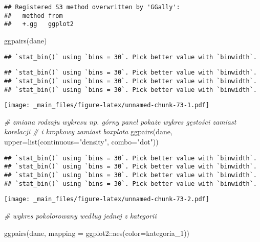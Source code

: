\documentclass[
]{book}
\newenvironment{Shaded}{\begin{snugshade}}{\end{snugshade}}
\newcommand{\AttributeTok}[1]{\textcolor[rgb]{0.77,0.63,0.00}{#1}}
\newcommand{\CommentTok}[1]{\textcolor[rgb]{0.56,0.35,0.01}{\textit{#1}}}
\newcommand{\FunctionTok}[1]{\textcolor[rgb]{0.00,0.00,0.00}{#1}}
\newcommand{\NormalTok}[1]{#1}
\newcommand{\SpecialCharTok}[1]{\textcolor[rgb]{0.00,0.00,0.00}{#1}}
\newcommand{\StringTok}[1]{\textcolor[rgb]{0.31,0.60,0.02}{#1}}
\begin{document}
\begin{verbatim}
## Registered S3 method overwritten by 'GGally':
##   method from   
##   +.gg   ggplot2
\end{verbatim}

\begin{Shaded}
\begin{Highlighting}[]
\FunctionTok{ggpairs}\NormalTok{(dane)}
\end{Highlighting}
\end{Shaded}

\begin{verbatim}
## `stat_bin()` using `bins = 30`. Pick better value with `binwidth`.
\end{verbatim}

\begin{verbatim}
## `stat_bin()` using `bins = 30`. Pick better value with `binwidth`.
## `stat_bin()` using `bins = 30`. Pick better value with `binwidth`.
## `stat_bin()` using `bins = 30`. Pick better value with `binwidth`.
\end{verbatim}

\texttt{[image: \_main\_files/figure-latex/unnamed-chunk-73-1.pdf]}

\begin{Shaded}
\begin{Highlighting}[]
\CommentTok{\# zmiana rodzaju wykresu np. górny panel pokaże wykres gęstości zamiast korelacji  }
\CommentTok{\# i kropkowy zamiast boxplota}
\FunctionTok{ggpairs}\NormalTok{(dane, }\AttributeTok{upper=}\FunctionTok{list}\NormalTok{(}\AttributeTok{continuous=}\StringTok{"density"}\NormalTok{, }\AttributeTok{combo=}\StringTok{"dot"}\NormalTok{))}
\end{Highlighting}
\end{Shaded}

\begin{verbatim}
## `stat_bin()` using `bins = 30`. Pick better value with `binwidth`.
## `stat_bin()` using `bins = 30`. Pick better value with `binwidth`.
## `stat_bin()` using `bins = 30`. Pick better value with `binwidth`.
## `stat_bin()` using `bins = 30`. Pick better value with `binwidth`.
\end{verbatim}

\texttt{[image: \_main\_files/figure-latex/unnamed-chunk-73-2.pdf]}

\begin{Shaded}
\begin{Highlighting}[]
\CommentTok{\# wykres pokolorowany według jednej z kategorii}

\FunctionTok{ggpairs}\NormalTok{(dane, }\AttributeTok{mapping =}\NormalTok{ ggplot2}\SpecialCharTok{::}\FunctionTok{aes}\NormalTok{(}\AttributeTok{color=}\NormalTok{kategoria\_1))}
\end{Highlighting}
\end{Shaded}
\end{document}

